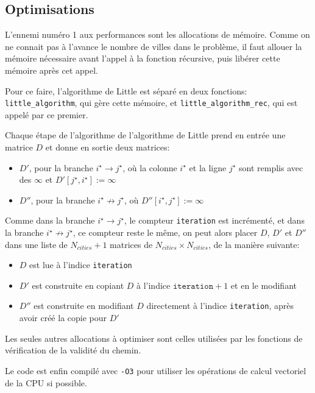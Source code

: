 \documentclass[12pt]{article}
\begin{document}
\subsection{Optimisations}

L'ennemi numéro 1 aux performances sont les allocations de mémoire.
Comme on ne connait pas à l'avance le nombre de villes dans le problème, il faut allouer la mémoire nécessaire avant l'appel à la fonction récursive, puis libérer cette mémoire après cet appel.

Pour ce faire, l'algorithme de Little est séparé en deux fonctions: \texttt{little\_algorithm}, qui gère cette mémoire, et \texttt{little\_algorithm\_rec}, qui est appelé par ce premier.

Chaque étape de l'algorithme de l'algorithme de Little prend en entrée une matrice $D$ et donne en sortie deux matrices:

\begin{itemize}
  \item $D'$, pour la branche $i^{\star} \rightarrow j^{\star}$, où la colonne $i^{\star}$ et la ligne $j^{\star}$ sont remplis avec des $\infty$ et $D'[j^{\star}, i^{\star}] := \infty$
  \item $D''$, pour la branche $i^{\star} \nrightarrow j^{\star}$, où $D''[i^{\star}, j^{\star}] := \infty$
\end{itemize}

Comme dans la branche $i^{\star} \rightarrow j^{\star}$, le compteur \texttt{iteration} est incrémenté, et dans la branche $i^{\star} \nrightarrow j^{\star}$, ce compteur reste le même, on peut alors placer $D$, $D'$ et $D''$ dans une liste de $N_{cities} + 1$ matrices de $N_{cities} \times N_{cities}$, de la manière suivante:

\begin{itemize}
  \item $D$ est lue à l'indice \texttt{iteration}
  \item $D'$ est construite en copiant $D$ à l'indice $\texttt{iteration}+1$ et en le modifiant
  \item $D''$ est construite en modifiant $D$ directement à l'indice \texttt{iteration}, après avoir créé la copie pour $D'$
\end{itemize}

Les seules autres allocations à optimiser sont celles utilisées par les fonctions de vérification de la validité du chemin.

Le code est enfin compilé avec \texttt{-O3} pour utiliser les opérations de calcul vectoriel de la CPU si possible.
\end{document}
